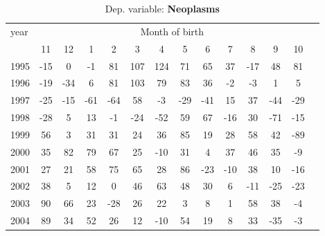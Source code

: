  \begin{table}[H] \begin{threeparttable} \centering \caption{Dep. variable: \textbf{Neoplasms}} {\def\sym#1{\ifmmode^{#1}\else\(^{#1}\)\fi} \begin{tabular}{l*{13}{c}} \toprule year & \multicolumn{12}{c}{Month of birth} \\ \cmidrule(lr){2-13} 
            &          11&          12&           1&           2&           3&           4&           5&           6&           7&           8&           9&          10\\
1995        &         -15&           0&          -1&          81&         107&         124&          71&          65&          37&         -17&          48&          81\\
1996        &         -19&         -34&           6&          81&         103&          79&          83&          36&          -2&          -3&           1&           5\\
1997        &         -25&         -15&         -61&         -64&          58&          -3&         -29&         -41&          15&          37&         -44&         -29\\
1998        &         -28&           5&          13&          -1&         -24&         -52&          59&          67&         -16&          30&         -71&         -15\\
1999        &          56&           3&          31&          31&          24&          36&          85&          19&          28&          58&          42&         -89\\
2000        &          35&          82&          79&          67&          25&         -10&          31&           4&          37&          46&          35&          -9\\
2001        &          27&          21&          58&          75&          65&          28&          86&         -23&         -10&          38&          10&         -16\\
2002        &          38&           5&          12&           0&          46&          63&          48&          30&           6&         -11&         -25&         -23\\
2003        &          90&          66&          23&         -28&          26&          22&           3&           8&           1&          58&          38&          -4\\
2004        &          89&          34&          52&          26&          12&         -10&          54&          19&           8&          33&         -35&          -3\\

\end{tabular}}
\end{threeparttable}
\end{table}
